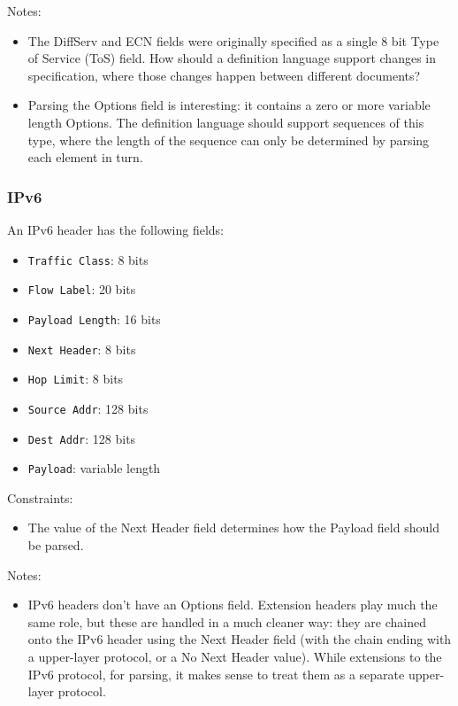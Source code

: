\documentclass[10pt,a4paper]{article}
\begin{document}
Notes:
\begin{itemize}
\item The DiffServ and ECN fields were originally specified as a single 8 bit 
Type of Service (ToS) field. How should a definition language support changes in
specification, where those changes happen between different documents?
\item Parsing the Options field is interesting: it contains a zero or more variable
length Options. The definition language should support sequences of this type, where the
length of the sequence can only be determined by parsing each element in turn.
\end{itemize}

\subsubsection{IPv6}

An IPv6 header has the following fields:
\begin{itemize}
\item \texttt{Traffic Class}: 8 bits
\item \texttt{Flow Label}: 20 bits
\item \texttt{Payload Length}: 16 bits
\item \texttt{Next Header}: 8 bits
\item \texttt{Hop Limit}: 8 bits
\item \texttt{Source Addr}: 128 bits
\item \texttt{Dest Addr}: 128 bits
\item \texttt{Payload}: variable length
\end{itemize}

Constraints:
\begin{itemize}
\item The value of the Next Header field determines how the Payload field should be parsed.
\end{itemize}

Notes:
\begin{itemize}
\item IPv6 headers don't have an Options field. Extension headers play much the same role,
but these are handled in a much cleaner way: they are chained onto the IPv6 header using
the Next Header field (with the chain ending with a upper-layer protocol, or a No Next
Header value). While extensions to the IPv6 protocol, for parsing, it makes sense to treat
them as a separate upper-layer protocol.
\end{itemize}
\end{document}
